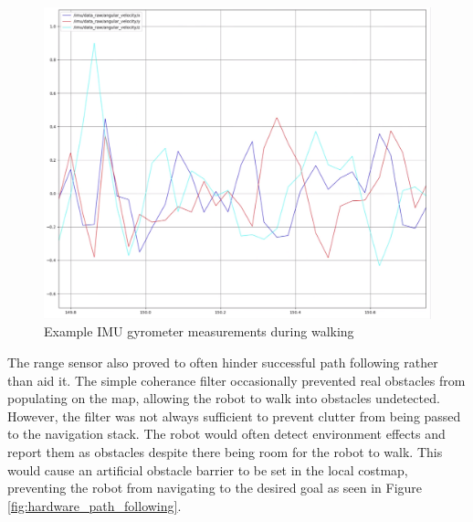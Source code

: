 \begin{figure}[H]
    \centerline{\includegraphics[scale=0.11]{06_results/figures/gyro_data.png}}
    \caption{Example IMU gyrometer measurements during walking}
    \label{fig:gyro_data}
\end{figure}

The range sensor also proved to often hinder successful path following rather than aid it. The simple coherance filter occasionally prevented real obstacles from populating on the map, allowing the robot to walk into obstacles undetected. However, the filter was not always sufficient to prevent clutter from being passed to the navigation stack. The robot would often detect environment effects and report them as obstacles despite there being room for the robot to walk. This would cause an artificial obstacle barrier to be set in the local costmap, preventing the robot from navigating to the desired goal as seen in Figure \ref{fig:hardware_path_following}. 


